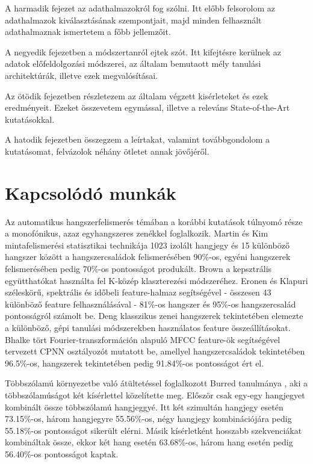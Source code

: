 A harmadik fejezet az adathalmazokról fog szólni. Itt előbb felsorolom az adathalmazok kiválasztásának szempontjait, majd minden felhasznált adathalmaznak ismertetem a főbb jellemzőit. 

A negyedik fejezetben a módszertanról ejtek szót. Itt kifejtésre kerülnek az adatok előfeldolgozási módszerei, az általam bemutaott mély tanulási architektúrák, illetve ezek megvalósításai.

Az ötödik fejezetben részletezem az általam végzett kisérleteket és ezek eredményeit. Ezeket összevetem egymással, illetve a releváns State-of-the-Art kutatásokkal.

A hatodik fejezetben összegzem a leírtakat, valamint továbbgondolom a kutatásomat, felvázolok néhány ötletet annak jövőjéről.


\section{Kapcsolódó munkák}

Az automatikus hangszerfelismerés témában a korábbi kutatások túlnyomó része a monofónikus, azaz egyhangszeres zenékkel foglalkozik. Martin és Kim \cite{Martin1998} mintafelismerési statisztikai technikája 1023 izolált hangjegy és 15 különböző hangszer között a hangszercsaládok felismerésében 90\%-os, egyéni hangszerek felismerésében pedig 70\%-os pontosságot produkált. Brown \cite{brown1999} a kepsztrális együtthatókat használta fel K-közép klaszterezési módszeréhez. Eronen és Klapuri \cite{eronenklapuri2000} széleskörű, spektrális és időbeli feature-halmaz segítségével - összesen 43 különböző feature felhasználásával - 81\%-os hangszer és 95\%-os hangszercsalád pontosságról számolt be. Deng \cite{deng2008} klasszikus zenei hangszerek tekintetében elemezte a különböző, gépi tanulási módszerekben használatos feature összeállításokat. Bhalke \cite{bhalke2015} tört Fourier-transzformáción alapuló MFCC feature-ök segítségével tervezett CPNN osztályozót mutatott be, amellyel hangszercsaládok tekintetében 96.5\%-os, hangszerek tekintetében pedig 91.84\%-os pontosságot ért el.

Többszólamú környezetbe való átültetéssel foglalkozott Burred tanulmánya \cite{burred2010}, aki a többszólamúságot két kísérlettel közelítette meg. Először csak egy-egy hangjegyet kombinált össze többszólamú hangjeggyé. Itt két szimultán hangjegy esetén 73.15\%-os, három hangjegyre 55.56\%-os, négy hangjegy kombinációjára pedig 55.18\%-os pontosságot sikerült elérni. Másik kísérletként hosszabb szekvenciákat kombináltak össze, ekkor két hang esetén 63.68\%-os, három hang esetén pedig 56.40\%-os pontosságot kaptak. 

